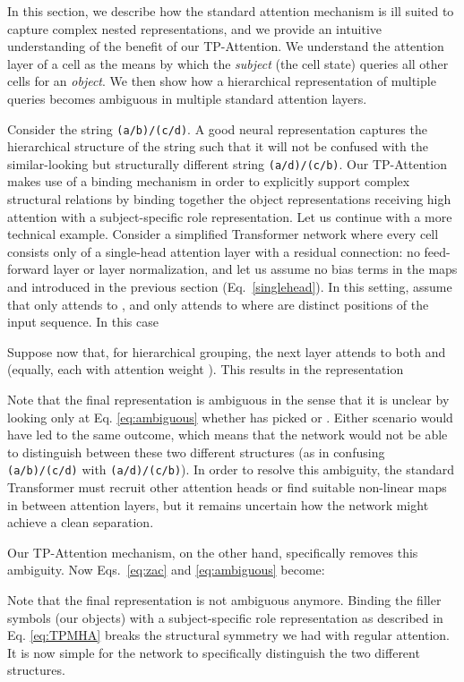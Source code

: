 \documentclass[11pt,a4paper]{article}
\begin{document}
In this section, we describe how the standard attention mechanism is ill suited to capture complex nested representations, and we provide an intuitive understanding of the benefit of our TP-Attention. 
We understand the attention layer of a cell as the means by which the \textit{subject} (the cell state) queries all other cells for an \textit{object}. 
We then show how a hierarchical representation of multiple queries becomes ambiguous in multiple standard attention layers. 

Consider the string \texttt{(a/b)/(c/d)}. 
A good neural representation captures the hierarchical structure of the string such that it will not be confused with the similar-looking but structurally different string \texttt{(a/d)/(c/b)}. 
Our TP-Attention makes use of a binding mechanism in order to explicitly support complex structural relations by binding together the object representations receiving high attention with a subject-specific role representation. 
Let us continue with a more technical example.
Consider a simplified Transformer network where every cell consists only of a single-head attention layer with a residual connection: no feed-forward layer or layer normalization, and let us assume no bias terms in the maps  and  introduced in the previous section (Eq.~\ref{singlehead}). 
In this setting, assume that  only attends to , and  only attends to  where  are distinct positions of the input sequence. 
In this case


Suppose now that, for hierarchical grouping, the next layer  attends to both  and  (equally, each with attention weight ). 
This results in the representation


Note that the final representation is ambiguous in the sense that it is unclear by looking only at Eq. \ref{eq:ambiguous} whether  has picked  or .
Either scenario would have led to the same outcome, which means that the network would not be able to distinguish between these two different structures (as in confusing \texttt{(a/b)/(c/d)} with \texttt{(a/d)/(c/b)}).
In order to resolve this ambiguity, the standard Transformer must recruit other attention heads or find suitable non-linear maps in between attention layers, but it remains uncertain how the network might achieve a clean separation.

Our TP-Attention mechanism, on the other hand, specifically removes this ambiguity.
Now Eqs.~\ref{eq:zac} and \ref{eq:ambiguous} become:

Note that the final representation is not ambiguous anymore.
Binding the filler symbols  (our objects) with a subject-specific role representation  as described in Eq. \ref{eq:TPMHA} breaks the structural symmetry we had with regular attention.
It is now simple for the network to specifically distinguish the two different structures.
\end{document}
